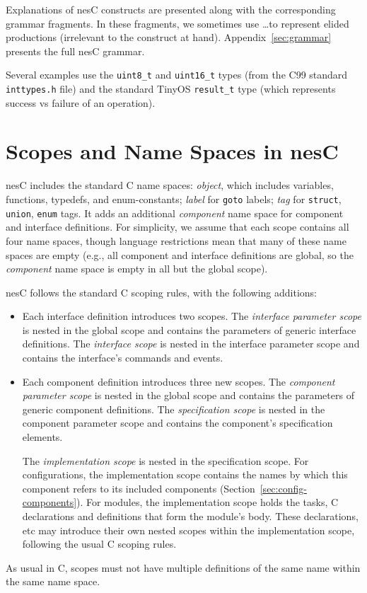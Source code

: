 \documentclass[11pt,letterpaper]{article}
\newcommand{\kw}[1]{{\tt #1}}
\newcommand{\code}[1]{{\tt #1}}
\newcommand{\file}[1]{{\tt #1}}
\newcommand{\nesc}{nesC\xspace}
\begin{document}
Explanations of \nesc constructs are presented along with the corresponding
grammar fragments. In these fragments, we sometimes use \ldots to represent
elided productions (irrelevant to the construct at
hand). Appendix~\ref{sec:grammar} presents the full \nesc grammar.

Several examples use the \code{uint8\_t} and \code{uint16\_t} types (from
the C99 standard \file{inttypes.h} file) and the standard TinyOS
\code{result\_t} type (which represents success vs failure of an operation).

\section{Scopes and Name Spaces in \nesc}
\label{sec:scoping}

\nesc includes the standard C name spaces: \emph{object}, which includes
variables, functions, typedefs, and enum-constants; \emph{label} for
\kw{goto} labels; \emph{tag} for \kw{struct}, \kw{union}, \kw{enum} tags.
It adds an additional \emph{component} name space for component and
interface definitions. For simplicity, we assume that each scope contains
all four name spaces, though language restrictions mean that many of these
name spaces are empty (e.g., all component and interface definitions are
global, so the \emph{component} name space is empty in all but the global
scope).

\nesc follows the standard C scoping rules, with the following
additions:
\begin{itemize}
\item Each interface definition introduces two scopes. The \emph{interface
parameter scope} is nested in the global scope and contains the parameters
of generic interface definitions. The \emph{interface scope} is nested in
the interface parameter scope and contains the interface's commands and
events.

\item Each component definition introduces three new scopes. The
\emph{component parameter scope} is nested in the global scope and contains
the parameters of generic component definitions. The \emph{specification
scope} is nested in the component parameter scope and contains the
component's specification elements. 

The \emph{implementation scope} is nested in the specification scope.  For
configurations, the implementation scope contains the names by which this
component refers to its included components
(Section~\ref{sec:config-components}). For modules, the implementation
scope holds the tasks, C declarations and definitions that form the
module's body. These declarations, etc may introduce their own nested
scopes within the implementation scope, following the usual C scoping
rules.
\end{itemize}
As usual in C, scopes must not have multiple definitions of the same
name within the same name space.
\end{document}
